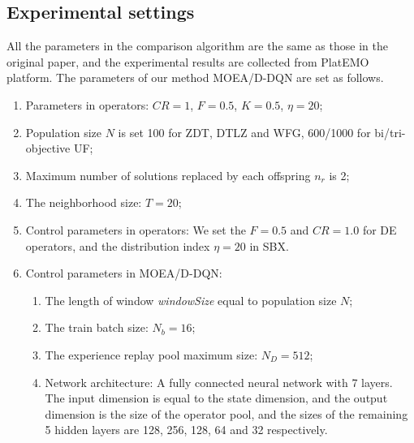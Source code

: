 \documentclass[journal]{IEEEtran}
\begin{document}
\subsection{Experimental settings}
All the parameters in the comparison algorithm are the same as those in the original paper, and the experimental results are collected from PlatEMO \cite{PlatEMO} platform.
The parameters of our method MOEA/D-DQN are set as follows.
\begin{enumerate}
  \item Parameters in operators: $CR=1$, $F=0.5$, $K=0.5$, $\eta=20$;
  \item Population size $N$ is set 100 for ZDT, DTLZ and WFG, 600/1000 for bi/tri-objective UF;
  \item Maximum number of solutions replaced by each offspring $n_r$ is 2;
  \item The neighborhood size: $T=20$;
  \item Control parameters in operators: We set the $F=0.5$ and $CR=1.0$ for DE operators, and the distribution index $\eta=20$ in SBX.
  \item Control parameters in MOEA/D-DQN:
        \begin{enumerate}
          \item The length of window \textit{windowSize} equal to population size $N$;
          \item The train batch size: $N_b = 16$;
          \item The experience replay pool maximum size: $N_D=512$;
          \item Network architecture: A fully connected neural network with 7 layers. The input dimension is equal to the state dimension, and the output dimension is the size of the operator pool, and the sizes of the remaining 5 hidden layers are 128, 256, 128, 64 and 32 respectively.
        \end{enumerate}
\end{enumerate}

\end{document}
